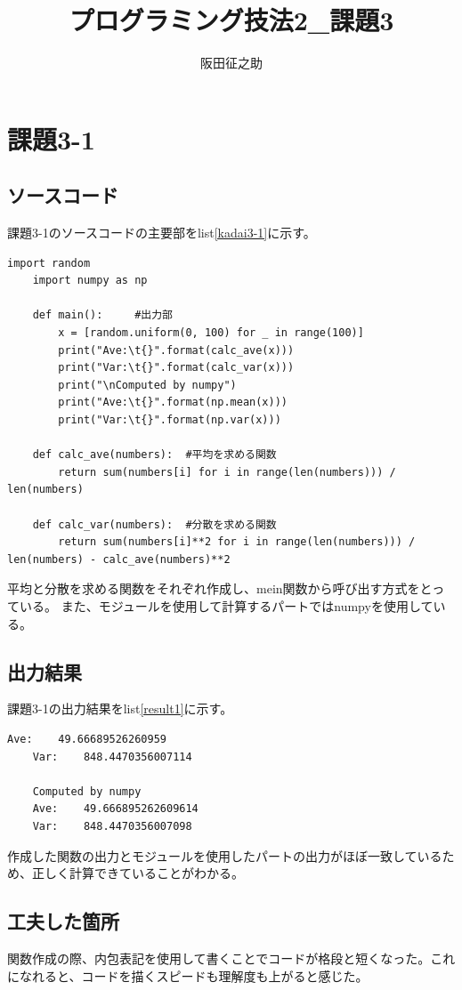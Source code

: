 \documentclass[a4paper]{ltjsarticle}
\begin{document}
\title{プログラミング技法2\_課題3}
\author{阪田征之助}
\maketitle
\newpage
\section*{課題3-1}
\subsection*{ソースコード}
課題3-1のソースコードの主要部をlist\ref{kadai3-1}に示す。

\begin{lstlisting}[caption=kadai3-1.py,label=kadai3-1]
    import random
    import numpy as np
    
    def main():     #出力部
        x = [random.uniform(0, 100) for _ in range(100)]
        print("Ave:\t{}".format(calc_ave(x)))
        print("Var:\t{}".format(calc_var(x)))
        print("\nComputed by numpy")
        print("Ave:\t{}".format(np.mean(x)))
        print("Var:\t{}".format(np.var(x)))

    def calc_ave(numbers):  #平均を求める関数
        return sum(numbers[i] for i in range(len(numbers))) / len(numbers)

    def calc_var(numbers):  #分散を求める関数
        return sum(numbers[i]**2 for i in range(len(numbers))) / len(numbers) - calc_ave(numbers)**2
\end{lstlisting}

平均と分散を求める関数をそれぞれ作成し、mein関数から呼び出す方式をとっている。
また、モジュールを使用して計算するパートではnumpyを使用している。

\subsection*{出力結果}
課題3-1の出力結果をlist\ref{result1}に示す。
\begin{lstlisting}[caption=output, label=result1]
    Ave:    49.66689526260959
    Var:    848.4470356007114
    
    Computed by numpy
    Ave:    49.666895262609614
    Var:    848.4470356007098
\end{lstlisting}
作成した関数の出力とモジュールを使用したパートの出力がほぼ一致しているため、正しく計算できていることがわかる。

\subsection*{工夫した箇所}
関数作成の際、内包表記を使用して書くことでコードが格段と短くなった。これになれると、コードを描くスピードも理解度も上がると感じた。
\newpage
\end{document}
